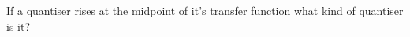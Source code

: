 \subsection{}

If a quantiser rises at the midpoint of it's transfer function what kind of quantiser is it?

